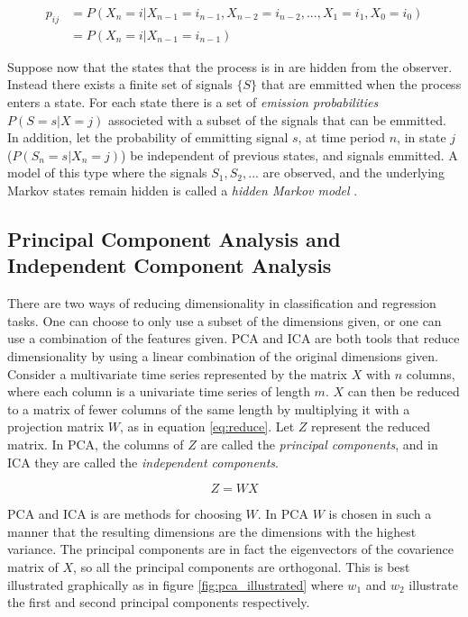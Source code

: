 \begin{equation}
    \begin{split}
        p_{ij}  &= P(X_n = i | X_{n-1} = i_{n-1}, X_{n-2} = i_{n-2},..., X_{1} = i_{1}, X_{0} = i_{0}) \\
                &= P(X_n = i | X_{n-1} = i_{n-1})      
    \end{split}
    \label{eq:markov_property}
\end{equation}

Suppose now that the states that the process is in are hidden from the observer. 
Instead there exists a finite set of signals $\{S\}$ that are emmitted when the process enters a state. 
For each state there is a set of \textit{emission probabilities} $P(S = s | X = j)$ associeted with a subset of the signals that can be emmitted.
In addition, let the probability of emmitting signal $s$, at time period $n$, in state $j$ ($P(S_n = s | X_n = j)$) be independent of previous states, and signals emmitted. 
A model of this type where the signals $S_1, S_2, ...$ are observed, and the underlying Markov states remain hidden is called a \textit{hidden Markov model} \cite{stoch_pros}. 

\subsection{Principal Component Analysis and Independent Component Analysis}
There are two ways of reducing dimensionality in classification and regression tasks. 
One can choose to only use a subset of the dimensions given, or one can use a combination of the features given.
PCA and ICA are both tools that reduce dimensionality by using a linear combination of the original dimensions given.
Consider a multivariate time series represented by the matrix $X$ with $n$ columns, where each column is a univariate time series of length $m$.
$X$ can then be reduced to a matrix of fewer columns of the same length by multiplying it with a projection matrix $W$, as in equation \ref{eq:reduce}. 
Let $Z$ represent the reduced matrix.
In PCA, the columns of $Z$ are called the \textit{principal components}, and in ICA they are called the \textit{independent components}. 

\begin{equation}
    Z = W X
    \label{eq:reduce}
\end{equation}

PCA and ICA is are methods for choosing $W$. 
In PCA $W$ is chosen in such a manner that the resulting dimensions are the dimensions with the highest variance.
The principal components are in fact the eigenvectors of the covarience matrix of $X$, so all the principal components are orthogonal. 
This is best illustrated graphically as in figure \ref{fig:pca_illustrated} where $w_1$ and $w_2$ illustrate the first and second principal components respectively.

